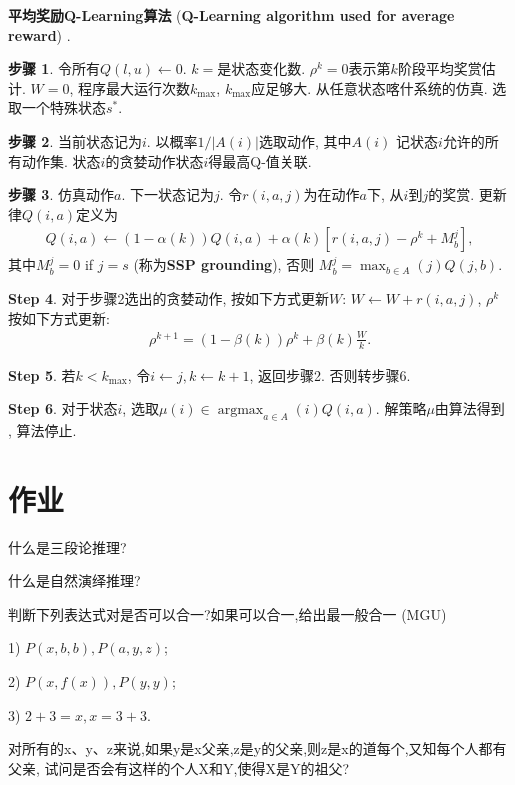 \textbf{平均奖励Q-Learning算法} (\textbf{Q-Learning algorithm used for average reward}) \cite{gosavi2004reinforcement}.

\textbf{步骤 1}. 令所有$Q(l,u) \leftarrow 0$. $k=$是状态变化数. $\rho^k=0$表示第$k$阶段平均奖赏估计. $W=0$, 程序最大运行次数$k_{\max}$, $k_{\max}$应足够大. 从任意状态喀什系统的仿真. 选取一个特殊状态$s^{*}$.

\textbf{步骤 2}. 当前状态记为$i$. 以概率$1/|A (i)|$选取动作, 其中$A(i)$ 记状态$i$允许的所有动作集. 状态$i$的贪婪动作状态$i$得最高Q-值关联.

\textbf{步骤 3}. 仿真动作$a$. 下一状态记为$j$. 令$r(i, a, j)$为在动作$a$下, 从$i$到$j$的奖赏. 更新律$Q(i,a)$定义为
\begin{eqnarray}
  Q(i,a)\leftarrow (1-\alpha(k))Q(i,a)+\alpha(k)[r(i,a,j)-\rho^k+M_b^j],
\end{eqnarray}
其中$M_b^j= 0$ if $j = s$ (称为\textbf{SSP grounding}), 否则 $M^j_b= \max_{b\in A}(j)Q(j,b)$.

\textbf{Step 4}. 对于步骤2选出的贪婪动作, 按如下方式更新$W$: $W \leftarrow W + r(i, a, j)$, $\rho^k$按如下方式更新:
\begin{eqnarray}
  \rho^{k+1}= (1 - \beta(k))\rho^k+ \beta(k)\frac{W}{k}.
\end{eqnarray}

\textbf{Step 5}. 若$k < k_{\max}$, 令$i \leftarrow j, k \leftarrow k + 1$, 返回步骤2. 否则转步骤6.

\textbf{Step 6}. 对于状态$i$, 选取$\mu(i)\in  \mathop{\arg\max}_{a\in A }(i)Q(i, a)$. 解策略$\mu$由算法得到 , 算法停止.

\section{作业}

\begin{think}
 什么是三段论推理?
\end{think}

\begin{think}
  什么是自然演绎推理?
\end{think}

\begin{think}
判断下列表达式对是否可以合一?如果可以合一,给出最一般合一 (MGU)

1) $P(x,b,b), P(a, y, z)$;

2) $P(x,f(x)),P(y,y)$;

3) $2+3=x,x=3+3$.
\end{think}

\begin{think}
  对所有的x、y、z来说,如果y是x父亲,z是y的父亲,则z是x的道每个,又知每个人都有父亲, 试问是否会有这样的个人X和Y,使得X是Y的祖父?
\end{think}
